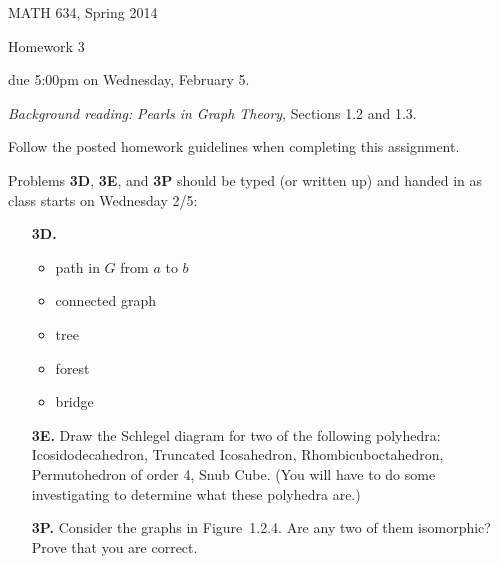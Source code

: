 \documentclass[12pt]{article}
\begin{document}
\pagestyle{empty}

\begin{center}\large 
MATH 634, Spring 2014

{\sc Homework 3}

due 5:00{\sc pm} on Wednesday, February 5.
\end{center}

\noindent
{\em Background reading:} {\em Pearls in Graph Theory}, Sections 1.2 and 1.3.

\smallskip\noindent
{\color{red} Follow the posted homework guidelines when completing this assignment.}

\smallskip\noindent
Problems {\bf 3D}, {\bf 3E}, and {\bf 3P} should be typed (or written up) and handed in as class starts on Wednesday 2/5:

\begin{enumerate}
\item[\bf 3D.]  

\begin{itemize}
\item path in $G$ from $a$ to $b$
\item connected graph
\item tree
\item forest
\item bridge
\end{itemize}

\item[\bf 3E.]   
Draw the Schlegel diagram for two of the following polyhedra: Icosidodecahedron, Truncated Icosahedron, Rhombicuboctahedron, Permutohedron of order 4, Snub Cube. (You will have to do some investigating to determine what these polyhedra are.)


\item[\bf 3P.]  
Consider the graphs in Figure~1.2.4.  Are any two of them isomorphic?  Prove that you are correct.
\end{enumerate}
\end{document}
